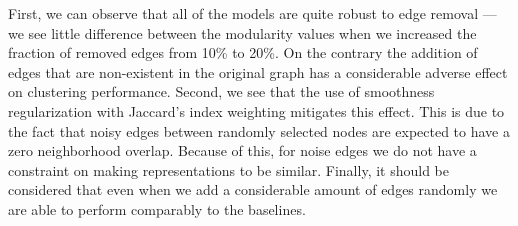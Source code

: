 First, we can observe that all of the models are quite robust to edge removal --- we see little difference between the modularity values when we increased the fraction of removed edges from 10\% to 20\%. On the contrary the addition of edges that are non-existent in the original graph has a considerable adverse effect on clustering performance. Second, we see that the use of smoothness regularization with Jaccard's index weighting mitigates this effect. This is due to the fact that noisy edges between randomly selected nodes are expected to have a zero neighborhood overlap. Because of this, for noise edges we do not have a constraint on making representations to be similar. Finally, it should be considered that even when we add a considerable amount of edges randomly we are able to perform comparably to the baselines.

